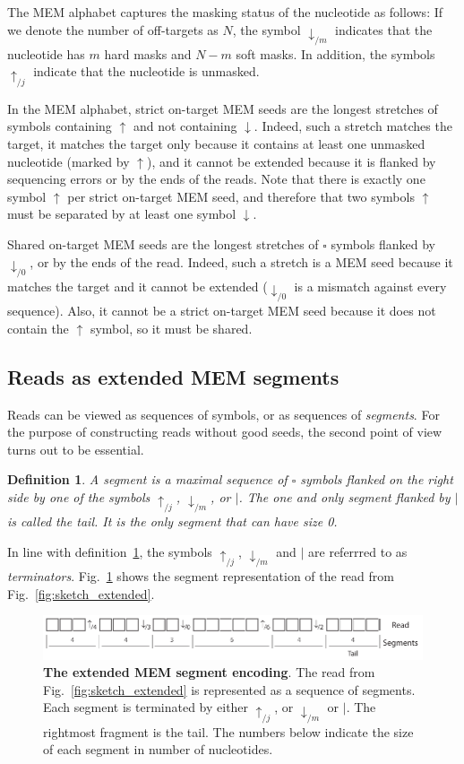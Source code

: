 \documentclass{article}
\newtheorem{definition}{Definition}
\begin{document}
The MEM alphabet captures the masking status of the nucleotide as follows:
If we denote the number of off-targets as $N$, the symbol
$\downarrow_{/m}$ indicates that the nucleotide has $m$ hard masks and
$N-m$ soft masks. In addition, the symbols $\uparrow_{/j}$ indicate that
the nucleotide is unmasked.

In the MEM alphabet, strict on-target MEM seeds are the longest stretches
of symbols containing $\uparrow$ and not containing $\downarrow$. Indeed,
such a stretch matches the target, it matches the target only because it
contains at least one unmasked nucleotide (marked by $\uparrow$), and it
cannot be extended because it is flanked by sequencing errors or by the
ends of the reads. Note that there is exactly one symbol $\uparrow$ per
strict on-target MEM seed, and therefore that two symbols $\uparrow$ must
be separated by at least one symbol $\downarrow$.

Shared on-target MEM seeds are the longest stretches of $\square$ symbols
flanked by $\downarrow_{/0}$, or by the ends of the read. Indeed, such a
stretch is a MEM seed because it matches the target and it cannot be
extended ($\downarrow_{/0}$ is a mismatch against every sequence). Also,
it cannot be a strict on-target MEM seed because it does not contain the
$\uparrow$ symbol, so it must be shared.

\subsection{Reads as extended MEM segments}

Reads can be viewed as sequences of symbols, or as sequences of
\emph{segments}. For the purpose of constructing reads without good seeds,
the second point of view turns out to be essential.

\begin{definition}
\label{def:segment}
A segment is a maximal sequence of $\square$ symbols flanked on the right
side by one of the symbols $\uparrow_{/j}$, $\downarrow_{/m}$, or $|$. The
one and only segment flanked by $|$ is called the tail. It is the only
segment that can have size 0.
\end{definition}

In line with definition~\ref{def:segment}, the symbols $\uparrow_{/j}$,
$\downarrow_{/m}$ and $|$ are referrred to as \emph{terminators}.
Fig.~\ref{fig:sketch_segment} shows the segment representation of the read
from Fig.~\ref{fig:sketch_extended}.

\begin{figure}[h]
\centering
\includegraphics[scale=.85]{sketch_segments.pdf}
\caption{\textbf{The extended MEM segment encoding}.
The read from Fig.~\ref{fig:sketch_extended} is represented as a sequence
of segments. Each segment is terminated by either $\uparrow_{/j}$, or
$\downarrow_{/m}$ or $|$. The rightmost fragment is the tail. The numbers
below indicate the size of each segment in number of nucleotides.}
\label{fig:sketch_segment}
\end{figure}
\end{document}
